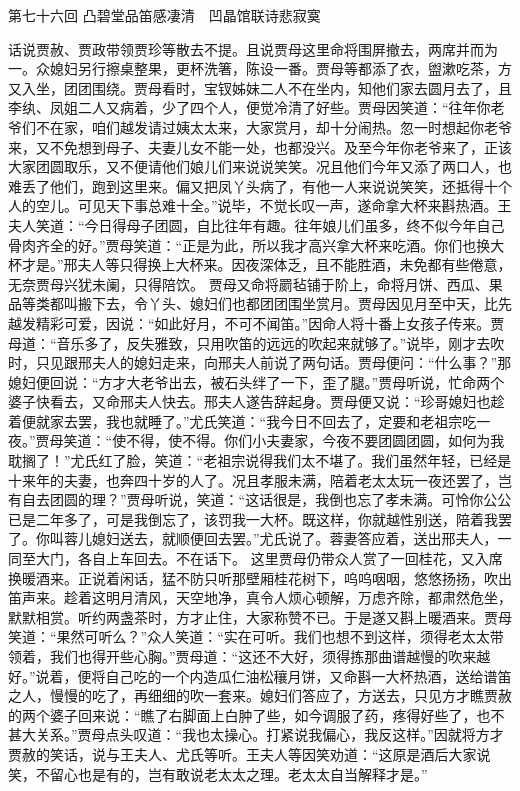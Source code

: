 \documentclass[12pt,oneside]{book}
\begin{document}
 
第七十六回  凸碧堂品笛感凄清　凹晶馆联诗悲寂寞


话说贾赦、贾政带领贾珍等散去不提。且说贾母这里命将围屏撤去，两席并而为一。众媳妇另行擦桌整果，更杯洗箸，陈设一番。贾母等都添了衣，盥漱吃茶，方又入坐，团团围绕。贾母看时，宝钗姊妹二人不在坐内，知他们家去圆月去了，且李纨、凤姐二人又病着，少了四个人，便觉冷清了好些。贾母因笑道：“往年你老爷们不在家，咱们越发请过姨太太来，大家赏月，却十分闹热。忽一时想起你老爷来，又不免想到母子、夫妻儿女不能一处，也都没兴。及至今年你老爷来了，正该大家团圆取乐，又不便请他们娘儿们来说说笑笑。况且他们今年又添了两口人，也难丢了他们，跑到这里来。偏又把凤丫头病了，有他一人来说说笑笑，还抵得十个人的空儿。可见天下事总难十全。”说毕，不觉长叹一声，遂命拿大杯来斟热酒。王夫人笑道：“今日得母子团圆，自比往年有趣。往年娘儿们虽多，终不似今年自己骨肉齐全的好。”贾母笑道：“正是为此，所以我才高兴拿大杯来吃酒。你们也换大杯才是。”邢夫人等只得换上大杯来。因夜深体乏，且不能胜酒，未免都有些倦意，无奈贾母兴犹未阑，只得陪饮。
贾母又命将罽毡铺于阶上，命将月饼、西瓜、果品等类都叫搬下去，令丫头、媳妇们也都团团围坐赏月。贾母因见月至中天，比先越发精彩可爱，因说：“如此好月，不可不闻笛。”因命人将十番上女孩子传来。贾母道：“音乐多了，反失雅致，只用吹笛的远远的吹起来就够了。”说毕，刚才去吹时，只见跟邢夫人的媳妇走来，向邢夫人前说了两句话。贾母便问：“什么事？”那媳妇便回说：“方才大老爷出去，被石头绊了一下，歪了腿。”贾母听说，忙命两个婆子快看去，又命邢夫人快去。邢夫人遂告辞起身。贾母便又说：“珍哥媳妇也趁着便就家去罢，我也就睡了。”尤氏笑道：“我今日不回去了，定要和老祖宗吃一夜。”贾母笑道：“使不得，使不得。你们小夫妻家，今夜不要团圆团圆，如何为我耽搁了！”尤氏红了脸，笑道：“老祖宗说得我们太不堪了。我们虽然年轻，已经是十来年的夫妻，也奔四十岁的人了。况且孝服未满，陪着老太太玩一夜还罢了，岂有自去团圆的理？”贾母听说，笑道：“这话很是，我倒也忘了孝未满。可怜你公公已是二年多了，可是我倒忘了，该罚我一大杯。既这样，你就越性别送，陪着我罢了。你叫蓉儿媳妇送去，就顺便回去罢。”尤氏说了。蓉妻答应着，送出邢夫人，一同至大门，各自上车回去。不在话下。
这里贾母仍带众人赏了一回桂花，又入席换暖酒来。正说着闲话，猛不防只听那壁厢桂花树下，呜呜咽咽，悠悠扬扬，吹出笛声来。趁着这明月清风，天空地净，真令人烦心顿解，万虑齐除，都肃然危坐，默默相赏。听约两盏茶时，方才止住，大家称赞不已。于是遂又斟上暖酒来。贾母笑道：“果然可听么？”众人笑道：“实在可听。我们也想不到这样，须得老太太带领着，我们也得开些心胸。”贾母道：“这还不大好，须得拣那曲谱越慢的吹来越好。”说着，便将自己吃的一个内造瓜仁油松穰月饼，又命斟一大杯热酒，送给谱笛之人，慢慢的吃了，再细细的吹一套来。媳妇们答应了，方送去，只见方才瞧贾赦的两个婆子回来说：“瞧了右脚面上白肿了些，如今调服了药，疼得好些了，也不甚大关系。”贾母点头叹道：“我也太操心。打紧说我偏心，我反这样。”因就将方才贾赦的笑话，说与王夫人、尤氏等听。王夫人等因笑劝道：“这原是酒后大家说笑，不留心也是有的，岂有敢说老太太之理。老太太自当解释才是。”
\end{document}
